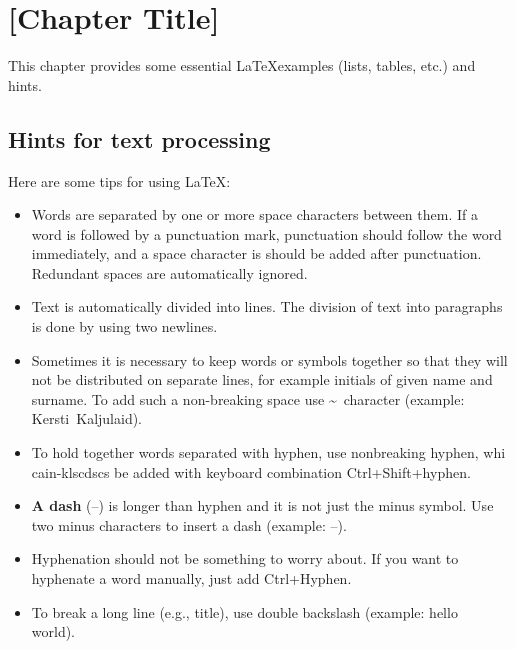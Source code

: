 \section{[Chapter Title]}

This chapter provides some essential \LaTeX examples (lists, tables,
etc.) and hints.

\subsection{Hints for text processing}

Here are some tips for using \LaTeX:

\begin{itemize}
\item Words are separated by one or       more space characters between
  them. If a word is followed by a punctuation mark, punctuation should
  follow the word immediately, and a space character is should be added
  after punctuation. Redundant
  spaces      are
  automatically             ignored.

\item Text is automatically divided into lines. The division of text
  into paragraphs is done by using two newlines.

\item Sometimes it is necessary to keep words or symbols together so
  that they will not be distributed on separate lines, for example
  initials of given name and surname. To add such a non-breaking space
  use \textasciitilde\ character (example: Kersti~Kaljulaid).

\item To hold together words separated with hyphen, use nonbreaking
  hyphen, whi \mbox{cain-klscdscs} be added with keyboard combination
  Ctrl+Shift+hyphen.

\item \textbf{A dash} (--) is longer than hyphen and it is not just
  the minus symbol. Use two minus characters to insert a dash
  (example: --).

\item Hyphenation should not be something to worry about. If you want to hyphenate a
  word manually, just add Ctrl+Hyphen.

\item To break a long line (e.g., title), use double backslash (example: hello\\world).
\end{itemize}

